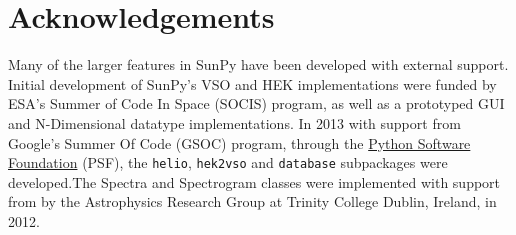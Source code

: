 \section{Acknowledgements}
Many of the larger features in SunPy have been developed with external support. 
Initial development of SunPy's VSO and HEK implementations were funded by ESA's 
Summer of Code In Space (SOCIS) program, as well as a prototyped GUI and 
N-Dimensional datatype implementations. In 2013 with support from Google's 
Summer Of Code (GSOC) program, through the 
\href{http://www.python.org/psf/}{Python Software Foundation} (PSF), the 
\texttt{helio}, \texttt{hek2vso} and \texttt{database} subpackages were 
developed.The Spectra and Spectrogram classes were implemented with support 
from by the Astrophysics Research Group at Trinity College Dublin, Ireland, in 
2012.